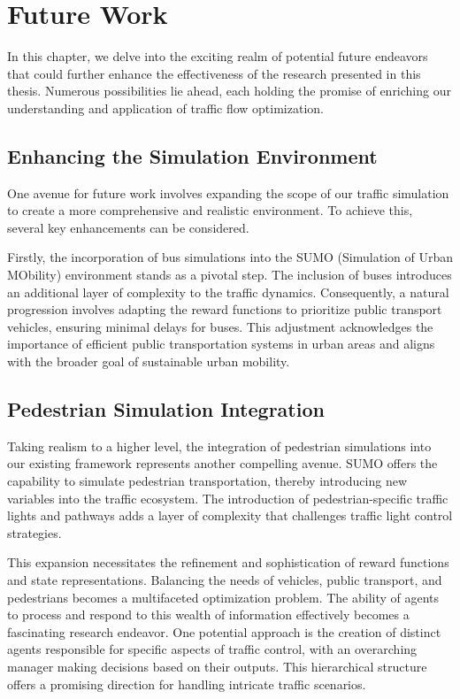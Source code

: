 \chapter{Future Work}
In this chapter, we delve into the exciting realm of potential future endeavors that could further enhance the effectiveness of the research presented in this thesis. Numerous possibilities lie ahead, each holding the promise of enriching our understanding and application of traffic flow optimization.

\section{Enhancing the Simulation Environment}
One avenue for future work involves expanding the scope of our traffic simulation to create a more comprehensive and realistic environment. To achieve this, several key enhancements can be considered.

Firstly, the incorporation of bus simulations into the SUMO (Simulation of Urban MObility) environment stands as a pivotal step. The inclusion of buses introduces an additional layer of complexity to the traffic dynamics. Consequently, a natural progression involves adapting the reward functions to prioritize public transport vehicles, ensuring minimal delays for buses. This adjustment acknowledges the importance of efficient public transportation systems in urban areas and aligns with the broader goal of sustainable urban mobility.

\section{Pedestrian Simulation Integration}
Taking realism to a higher level, the integration of pedestrian simulations into our existing framework represents another compelling avenue. SUMO offers the capability to simulate pedestrian transportation, thereby introducing new variables into the traffic ecosystem. The introduction of pedestrian-specific traffic lights and pathways adds a layer of complexity that challenges traffic light control strategies.

This expansion necessitates the refinement and sophistication of reward functions and state representations. Balancing the needs of vehicles, public transport, and pedestrians becomes a multifaceted optimization problem. The ability of agents to process and respond to this wealth of information effectively becomes a fascinating research endeavor. One potential approach is the creation of distinct agents responsible for specific aspects of traffic control, with an overarching manager making decisions based on their outputs. This hierarchical structure offers a promising direction for handling intricate traffic scenarios.


